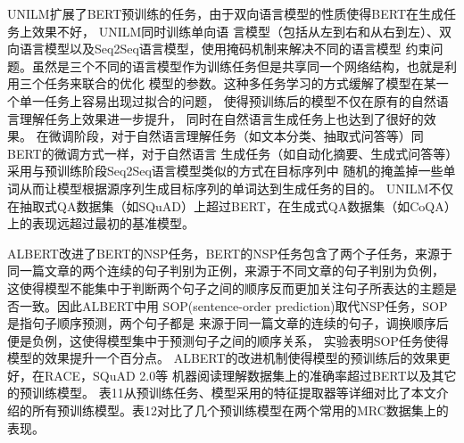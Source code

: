 UNILM扩展了BERT预训练的任务，由于双向语言模型的性质使得BERT在生成任务上效果不好，
UNILM同时训练单向语
言模型（包括从左到右和从右到左）、双向语言模型以及Seq2Seq语言模型，使用掩码机制来解决不同的语言模型
约束问题。虽然是三个不同的语言模型作为训练任务但是共享同一个网络结构，也就是利用三个任务来联合的优化
模型的参数。这种多任务学习的方式缓解了模型在某一个单一任务上容易出现过拟合的问题，
使得预训练后的模型不仅在原有的自然语言理解任务上效果进一步提升，
同时在自然语言生成任务上也达到了很好的效果。
在微调阶段，对于自然语言理解任务（如文本分类、抽取式问答等）同BERT的微调方式一样，对于自然语言
生成任务（如自动化摘要、生成式问答等）采用与预训练阶段Seq2Seq语言模型类似的方式在目标序列中
随机的掩盖掉一些单词从而让模型根据源序列生成目标序列的单词达到生成任务的目的。
UNILM不仅在抽取式QA数据集（如SQuAD）上超过BERT，在生成式QA数据集（如CoQA）上的表现远超过最初的基准模型。




ALBERT改进了BERT的NSP任务，BERT的NSP任务包含了两个子任务，来源于同一篇文章的两个连续的句子判别为正例，来源于不同文章的句子判别为负例，
这使得模型不能集中于判断两个句子之间的顺序反而更加关注句子所表达的主题是否一致。因此ALBERT中用
SOP(sentence-order prediction)取代NSP任务，SOP是指句子顺序预测，两个句子都是
来源于同一篇文章的连续的句子，调换顺序后便是负例，这使得模型集中于预测句子之间的顺序关系，
实验表明SOP任务使得模型的效果提升一个百分点。
ALBERT的改进机制使得模型的预训练后的效果更好，在RACE，SQuAD 2.0等
机器阅读理解数据集上的准确率超过BERT以及其它的预训练模型。
表11从预训练任务、模型采用的特征提取器等详细对比了本文介绍的所有预训练模型。表12对比了几个预训练模型在两个常用的MRC数据集上的表现。

